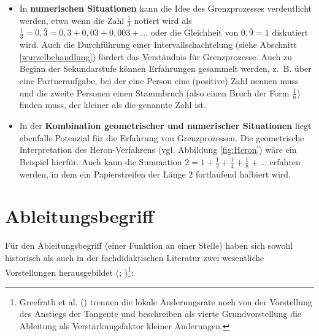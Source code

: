 \documentclass[
]{scrbook}
\theoremstyle{definition}
\theoremstyle{definition}
\theoremstyle{definition}
\theoremstyle{definition}
\theoremstyle{remark}
\begin{document}
\begin{itemize}
\item
  In \textbf{numerischen Situationen} kann die Idee des Grenzprozesses verdeutlicht werden, etwa wenn die Zahl \(\frac{1}{3}\) notiert wird als \(\frac{1}{3} = 0,\bar{3} = 0,3 + 0,03 + 0,003 + \ldots\) oder die Gleichheit von \(0,\bar{9} = 1\) diskutiert wird. Auch die Durchführung einer Intervallschachtelung (siehe Abschnitt \ref{wurzelbehandlung}) fördert das Verständnis für Grenzprozesse. Auch zu Beginn der Sekundarstufe können Erfahrungen gesammelt werden, z.~B. über eine Partneraufgabe, bei der eine Person eine (positive) Zahl nennen muss und die zweite Personen einen Stammbruch (also einen Bruch der Form \(\frac{1}{n}\)) finden muss, der kleiner als die genannte Zahl ist.
\item
  In der \textbf{Kombination geometrischer und numerischer Situationen} liegt ebenfalls Potenzial für die Erfahrung von Grenzprozessen. Die geometrische Interpretation des Heron-Verfahrens (vgl. Abbildung \ref{fig:Heron}) wäre ein Beispiel hierfür. Auch kann die Summation \(2 = 1 + \frac{1}{2} + \frac{1}{4} + \frac{1}{8}+\ldots\) erfahren werden, in dem ein Papierstreifen der Länge \(2\) fortlaufend halbiert wird.
\end{itemize}

\section{Ableitungsbegriff}\label{ableitungsbegriff}

Für den Ableitungsbegriff (einer Funktion an einer Stelle) haben sich sowohl historisch als auch in der fachdidaktischen Literatur zwei wesentliche Vorstellungen herausgebildet (; )\footnote{Greefrath et al. () trennen die lokale Änderungsrate noch von der Vorstellung des Anstiegs der Tangente und beschreiben als vierte Grundvorstellung die Ableitung als Verstärkungsfaktor kleiner Änderungen.}:
\end{document}
